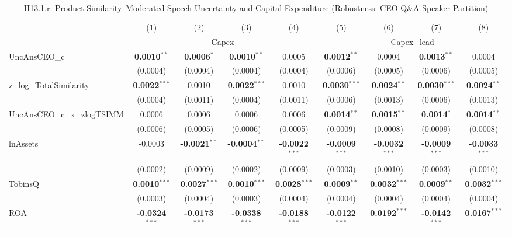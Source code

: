 \documentclass[11pt,a4paper]{article}
\begin{document}
\begin{table}[htbp]
\centering
\caption{H13.1.r: Product Similarity--Moderated Speech Uncertainty and Capital Expenditure (Robustness: CEO Q\&A Speaker Partition)}
\label{tab:h13_1_robust}
\scriptsize
\begin{tabular}{lcccccccc}
\toprule
 & (1) & (2) & (3) & (4) & (5) & (6) & (7) & (8) \\
 & \multicolumn{4}{c}{Capex} & \multicolumn{4}{c}{Capex\_lead} \\
\cmidrule(lr){2-5} \cmidrule(lr){6-9}
\midrule
UncAnsCEO\_c & \textbf{0.0010}$^{**}$ & \textbf{0.0006}$^{*}$ & \textbf{0.0010}$^{**}$ & 0.0005 & \textbf{0.0012}$^{**}$ & 0.0004 & \textbf{0.0013}$^{**}$ & 0.0004 \\
 & (0.0004) & (0.0004) & (0.0004) & (0.0004) & (0.0006) & (0.0005) & (0.0006) & (0.0005) \\
z\_log\_TotalSimilarity & \textbf{0.0022}$^{***}$ & 0.0010 & \textbf{0.0022}$^{***}$ & 0.0010 & \textbf{0.0030}$^{***}$ & \textbf{0.0024}$^{**}$ & \textbf{0.0030}$^{***}$ & \textbf{0.0024}$^{**}$ \\
 & (0.0004) & (0.0011) & (0.0004) & (0.0011) & (0.0006) & (0.0013) & (0.0006) & (0.0013) \\
UncAnsCEO\_c\_x\_zlogTSIMM & 0.0006 & 0.0006 & 0.0006 & 0.0006 & \textbf{0.0014}$^{**}$ & \textbf{0.0015}$^{**}$ & \textbf{0.0014}$^{*}$ & \textbf{0.0014}$^{**}$ \\
 & (0.0006) & (0.0005) & (0.0006) & (0.0005) & (0.0009) & (0.0008) & (0.0009) & (0.0008) \\
\midrule
lnAssets & -0.0003 & \textbf{-0.0021}$^{**}$ & \textbf{-0.0004}$^{**}$ & \textbf{-0.0022}$^{***}$ & \textbf{-0.0009}$^{***}$ & \textbf{-0.0032}$^{***}$ & \textbf{-0.0009}$^{***}$ & \textbf{-0.0033}$^{***}$ \\
 & (0.0002) & (0.0009) & (0.0002) & (0.0009) & (0.0003) & (0.0010) & (0.0003) & (0.0010) \\
TobinsQ & \textbf{0.0010}$^{***}$ & \textbf{0.0027}$^{***}$ & \textbf{0.0010}$^{***}$ & \textbf{0.0028}$^{***}$ & \textbf{0.0009}$^{**}$ & \textbf{0.0032}$^{***}$ & \textbf{0.0009}$^{**}$ & \textbf{0.0032}$^{***}$ \\
 & (0.0003) & (0.0004) & (0.0003) & (0.0004) & (0.0004) & (0.0004) & (0.0004) & (0.0004) \\
ROA & \textbf{-0.0324}$^{***}$ & \textbf{-0.0173}$^{***}$ & \textbf{-0.0338}$^{***}$ & \textbf{-0.0188}$^{***}$ & \textbf{-0.0122}$^{***}$ & \textbf{0.0192}$^{***}$ & \textbf{-0.0142}$^{***}$ & \textbf{0.0167}$^{***}$ \\

\end{tabular}
\end{table}
\end{document}
